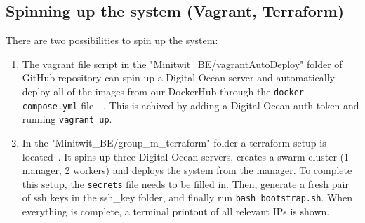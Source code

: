 \subsection{Spinning up the system (Vagrant, Terraform)}

There are two possibilities to spin up the system:

\begin{enumerate}
  \item The vagrant file script in the "Minitwit\_BE/vagrantAutoDeploy" folder of GitHub repository can spin up a Digital Ocean server and automatically deploy all of the images from our DockerHub through the \texttt{docker-compose.yml} file~\cite{vagrant}~\cite{dockerComposeDefault}. This is achived by adding a Digital Ocean auth token and running \texttt{vagrant up}.
  
  \item In the "Minitwit\_BE/group\_m\_terraform" folder a terraform setup is located~\cite{terraform}. It spins up three Digital Ocean servers, creates a swarm cluster (1 manager, 2 workers) and deploys the system from the manager. To complete this setup, the \texttt{secrets} file needs to be filled in. Then, generate a fresh pair of ssh keys in the ssh\_key folder, and finally run \texttt{bash bootstrap.sh}. When everything is complete, a terminal printout of all relevant IPs is shown.
\end{enumerate}
